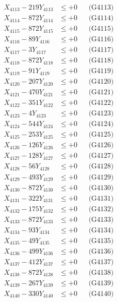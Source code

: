 \documentclass[a4paper,10pt]{article}
\begin{document}
{\begin{align}
X_{4113} - 219Y_{4113} &\leq +0 && \text{(G4113)} \\
X_{4114} - 872Y_{4114} &\leq +0 && \text{(G4114)} \\
X_{4115} - 872Y_{4115} &\leq +0 && \text{(G4115)} \\
X_{4116} - 89Y_{4116} &\leq +0 && \text{(G4116)} \\
X_{4117} - 3Y_{4117} &\leq +0 && \text{(G4117)} \\
X_{4118} - 872Y_{4118} &\leq +0 && \text{(G4118)} \\
X_{4119} - 91Y_{4119} &\leq +0 && \text{(G4119)} \\
X_{4120} - 207Y_{4120} &\leq +0 && \text{(G4120)} \\
\allowbreak
X_{4121} - 470Y_{4121} &\leq +0 && \text{(G4121)} \\
X_{4122} - 351Y_{4122} &\leq +0 && \text{(G4122)} \\
X_{4123} - 4Y_{4123} &\leq +0 && \text{(G4123)} \\
X_{4124} - 544Y_{4124} &\leq +0 && \text{(G4124)} \\
X_{4125} - 253Y_{4125} &\leq +0 && \text{(G4125)} \\
X_{4126} - 126Y_{4126} &\leq +0 && \text{(G4126)} \\
X_{4127} - 128Y_{4127} &\leq +0 && \text{(G4127)} \\
X_{4128} - 56Y_{4128} &\leq +0 && \text{(G4128)} \\
X_{4129} - 493Y_{4129} &\leq +0 && \text{(G4129)} \\
X_{4130} - 872Y_{4130} &\leq +0 && \text{(G4130)} \\
\allowbreak
X_{4131} - 322Y_{4131} &\leq +0 && \text{(G4131)} \\
X_{4132} - 175Y_{4132} &\leq +0 && \text{(G4132)} \\
X_{4133} - 872Y_{4133} &\leq +0 && \text{(G4133)} \\
X_{4134} - 93Y_{4134} &\leq +0 && \text{(G4134)} \\
X_{4135} - 49Y_{4135} &\leq +0 && \text{(G4135)} \\
X_{4136} - 499Y_{4136} &\leq +0 && \text{(G4136)} \\
X_{4137} - 412Y_{4137} &\leq +0 && \text{(G4137)} \\
X_{4138} - 872Y_{4138} &\leq +0 && \text{(G4138)} \\
X_{4139} - 267Y_{4139} &\leq +0 && \text{(G4139)} \\
X_{4140} - 330Y_{4140} &\leq +0 && \text{(G4140)} \\

\end{align}}
\end{document}
